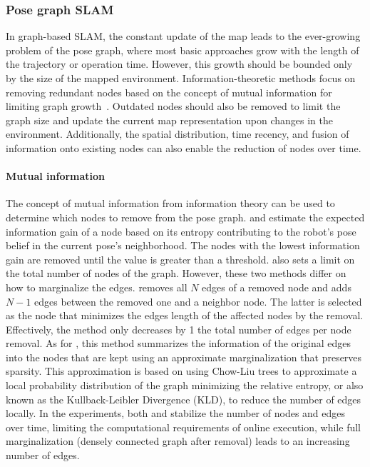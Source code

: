 \subsubsection{Pose graph SLAM}

In graph-based SLAM, the constant update of the map leads to the ever-growing problem of the pose graph, where most basic approaches grow with the length of the trajectory or operation time. However, this growth should be bounded only by the size of the mapped environment. Information-theoretic methods focus on removing redundant nodes based on the concept of mutual information for limiting graph growth~\parencite{kretzschmar-stachniss:2012:0278364912455072}. Outdated nodes should also be removed to limit the graph size and update the current map representation upon changes in the environment. Additionally, the spatial distribution, time recency, and fusion of information onto existing nodes can also enable the reduction of nodes over time.


\paragraph{Mutual information}

The concept of mutual information from information theory can be used to determine which nodes to remove from the pose graph.
\cite{kretzschmar-et-al:2010:2} and \cite{kretzschmar-stachniss:2012:0278364912455072} estimate the expected information gain of a node based on its entropy contributing to the robot's pose belief in the current pose's neighborhood. The nodes with the lowest information gain are removed until the value is greater than a threshold. \cite{kretzschmar-stachniss:2012:0278364912455072} also sets a limit on the total number of nodes of the graph.
However, these two methods differ on how to marginalize the edges.
\cite{kretzschmar-et-al:2010:2} removes all $N$ edges of a removed node and adds $N-1$ edges between the removed one and a neighbor node. The latter is selected as the node that minimizes the edges length of the affected nodes by the removal. Effectively, the method only decreases by 1 the total number of edges per node removal.
As for \cite{kretzschmar-stachniss:2012:0278364912455072}, this method summarizes the information of the original edges into the nodes that are kept using an approximate marginalization that preserves sparsity. This approximation is based on using Chow-Liu trees to approximate a local probability distribution of the graph minimizing the relative entropy, or also known as the Kullback-Leibler Divergence (KLD), to reduce the number of edges locally.
In the experiments, both \cite{kretzschmar-et-al:2010:2} and \cite{kretzschmar-stachniss:2012:0278364912455072} stabilize the number of nodes and edges over time, limiting the computational requirements of online execution, while full marginalization (densely connected graph after removal) leads to an increasing number of edges.

